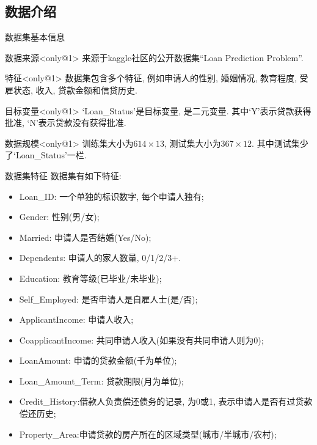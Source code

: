 \documentclass{beamer}
\begin{document}
\subsection{数据介绍}
\begin{frame}[fragile]{数据集基本信息}
	\begin{block}{数据来源}<only@1>
		来源于kaggle社区的公开数据集``Loan Prediction Problem''.
	\end{block}
	\begin{block}{特征}<only@1>
		数据集包含多个特征, 例如申请人的性别, 婚姻情况, 教育程度, 受雇状态, 收入, 贷款金额和信贷历史.
	\end{block}
	\begin{block}{目标变量}<only@1>
		`Loan\_Status'是目标变量, 是二元变量. 其中`Y'表示贷款获得批准, `N'表示贷款没有获得批准.
	\end{block}
	\begin{block}{数据规模}<only@1>
		训练集大小为$614\times 13$, 测试集大小为$367\times 12$. 其中测试集少了`Loan\_Status'一栏.
	\end{block}
\end{frame}

\begin{frame}[fragile]{数据集特征}
	数据集有如下特征:
	\begin{itemize}
		\item Loan\_ID: 一个单独的标识数字, 每个申请人独有;
		\item Gender: 性别(男/女);
		\item Married: 申请人是否结婚(Yes/No);
		\item Dependents: 申请人的家人数量, 0/1/2/3+.
		\item Education: 教育等级(已毕业/未毕业);
		\item Self\_Employed: 是否申请人是自雇人士(是/否);
		\item ApplicantIncome: 申请人收入;
		\item CoapplicantIncome: 共同申请人收入(如果没有共同申请人则为0);
		\item LoanAmount: 申请的贷款金额(千为单位);
		\item Loan\_Amount\_Term: 贷款期限(月为单位);
		\item Credit\_History:借款人负责偿还债务的记录, 为0或1, 表示申请人是否有过贷款偿还历史;
		\item Property\_Area:申请贷款的房产所在的区域类型(城市/半城市/农村);
	\end{itemize}
\end{frame}
\end{document}

